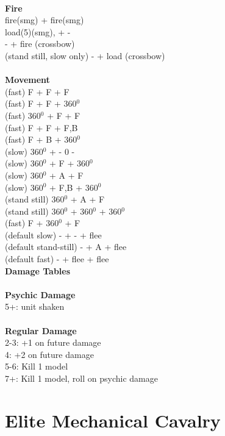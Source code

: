 \ \\ {\bf Fire } \\
fire(smg) + fire(smg) \\
load(5)(smg), + -  \\
- + fire (crossbow) \\
(stand still, slow only) - + load (crossbow) \\
\ \\ {\bf Movement } \\
(fast) F + F + F  \\
(fast) F + F + 360$^0$ \\
(fast) 360$^0$ + F + F \\
(fast) F + F + F,B \\
(fast) F + B + 360$^0$ \\
(slow) 360$^0$ + - 0 - \\
(slow) 360$^0$ + F + 360$^0$ \\
(slow) 360$^0$ + A + F \\
(slow) 360$^0$ + F,B + 360$^0$ \\
(stand still) 360$^0$ + A + F \\
(stand still) 360$^0$ + 360$^0$ + 360$^0$ \\
(fast) F + 360$^0$ + F \\
(default slow) - + - + flee \\
(default stand-still) - + A + flee \\
(default fast) - + flee + flee \\



{\bf Damage Tables} \\
\ \\ {\bf Psychic Damage } \\
5+: unit shaken \\
\ \\ {\bf Regular Damage } \\
2-3: +1 on future damage \\
4: +2 on future damage \\
5-6: Kill 1 model \\
7+: Kill 1 model, roll on psychic damage \\









\pagebreak

\section{ Elite Mechanical Cavalry }

